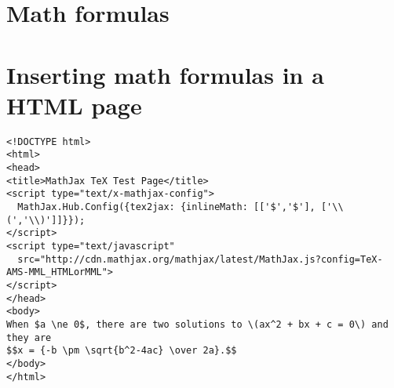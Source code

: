 \section{Math formulas}

\section{Inserting math formulas in a HTML page}
\begin{verbatim}
<!DOCTYPE html>
<html>
<head>
<title>MathJax TeX Test Page</title>
<script type="text/x-mathjax-config">
  MathJax.Hub.Config({tex2jax: {inlineMath: [['$','$'], ['\\(','\\)']]}});
</script>
<script type="text/javascript"
  src="http://cdn.mathjax.org/mathjax/latest/MathJax.js?config=TeX-AMS-MML_HTMLorMML">
</script>
</head>
<body>
When $a \ne 0$, there are two solutions to \(ax^2 + bx + c = 0\) and they are
$$x = {-b \pm \sqrt{b^2-4ac} \over 2a}.$$
</body>
</html>
\end{verbatim}
